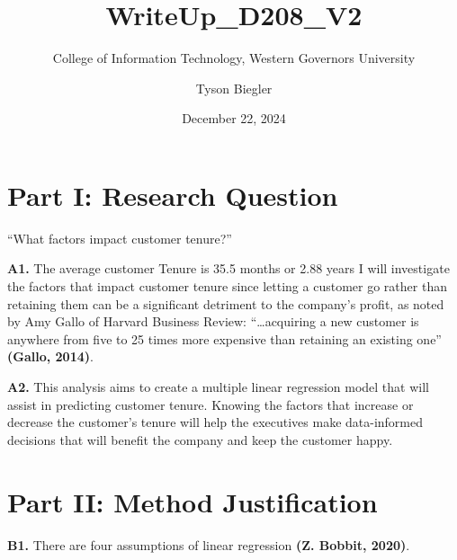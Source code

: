 \documentclass[
]{article}
\title{WriteUp\_D208\_V2}
\subtitle{College of Information Technology, Western Governors
University}
\author{Tyson Biegler}
\date{December 22, 2024}
\begin{document}
\maketitle

\section{Part I: Research Question}\label{part-i-research-question}

``What factors impact customer tenure?''

\textbf{A1.} The average customer Tenure is 35.5 months or 2.88 years I
will investigate the factors that impact customer tenure since letting a
customer go rather than retaining them can be a significant detriment to
the company's profit, as noted by Amy Gallo of Harvard Business Review:
``\ldots acquiring a new customer is anywhere from five to 25 times more
expensive than retaining an existing one'' \textbf{(Gallo, 2014)}.

\textbf{A2.} This analysis aims to create a multiple linear regression
model that will assist in predicting customer tenure. Knowing the
factors that increase or decrease the customer's tenure will help the
executives make data-informed decisions that will benefit the company
and keep the customer happy.

\section{Part II: Method
Justification}\label{part-ii-method-justification}

\textbf{B1.} There are four assumptions of linear regression \textbf{(Z.
Bobbit, 2020)}.
\end{document}
